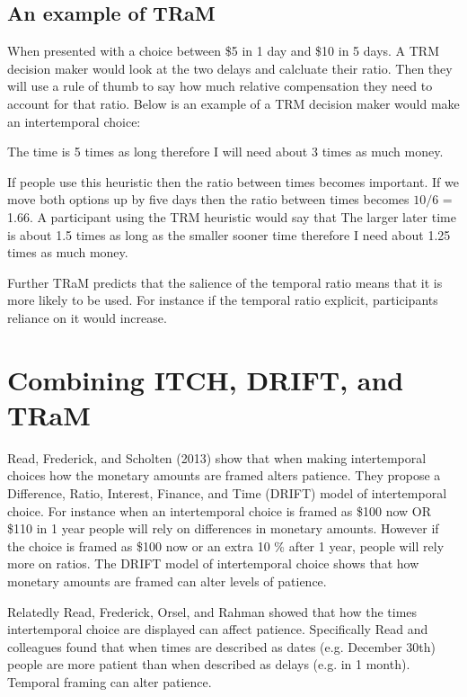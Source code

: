 \documentclass[]{article}
\begin{document}
\subsection{An example of TRaM}

When presented with a choice between \$5 in 1 day and \$10 in 5 days. 
A TRM decision maker would look at the two delays and calcluate their ratio. 
Then they will use a rule of thumb to say how much relative compensation they need to account for that ratio.
Below is an example of a TRM decision maker would make an intertemporal choice:

The time is 5 times as long therefore I will need about 3 times as much money. 

If people use this heuristic then the ratio between times becomes important. 
If we move both options up by five days then the ratio between times becomes $10/6$ = 1.66. A participant using the TRM heuristic would say that 
The larger later time is about 1.5 times as long as the smaller sooner time therefore I need about 1.25 times as much money. 

Further TRaM predicts that the salience of the temporal ratio means that it is more likely to be used. 
For instance if the temporal ratio explicit, participants reliance on it would increase.



\section{Combining ITCH, DRIFT, and TRaM }

Read, Frederick, and Scholten (2013) show that when making intertemporal choices how the monetary amounts are framed alters patience. 
They propose a Difference, Ratio, Interest, Finance, and Time (DRIFT) model of intertemporal choice. 
For instance when an intertemporal choice is framed as \$100 now OR \$110 in 1 year people will rely on differences in monetary amounts.
However if the choice is framed as \$100 now or an extra 10 \% after 1 year, people will rely more on ratios. 
The DRIFT model of intertemporal choice shows that how monetary amounts are framed can alter levels of patience.

Relatedly Read, Frederick, Orsel, and Rahman showed that how the times intertemporal choice are displayed can affect patience. Specifically Read and colleagues found that when times are described as dates (e.g. December 30th) people are more patient than when described as delays (e.g. in 1 month). Temporal framing can alter patience. 
\end{document}
